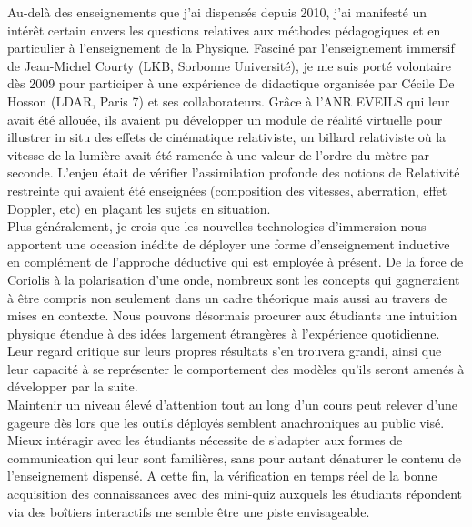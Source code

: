 \documentclass[12pt,onecolumn]{article}
\begin{document}
\indent \indent Au-delà des enseignements que j'ai dispensés depuis 2010, j'ai manifesté un intérêt certain envers les questions relatives aux méthodes pédagogiques et en particulier à l'enseignement de la Physique. Fasciné par l'enseignement immersif de Jean-Michel Courty (LKB, Sorbonne Université), je me suis porté volontaire dès 2009 pour participer à une expérience de didactique organisée par Cécile De Hosson (LDAR, Paris 7) et ses collaborateurs. Grâce à l'ANR EVEILS qui leur avait été allouée, ils avaient pu développer un module de réalité virtuelle pour illustrer in situ des effets de cinématique relativiste, un billard relativiste où la vitesse de la lumière avait été ramenée à une valeur de l'ordre du mètre par seconde. L'enjeu était de vérifier l'assimilation profonde des notions de Relativité restreinte qui avaient été enseignées (composition des vitesses, aberration, effet Doppler, etc) en plaçant les sujets en situation.\\

Plus généralement, je crois que les nouvelles technologies d'immersion nous apportent une occasion inédite de déployer une forme d'enseignement inductive en complément de l'approche déductive qui est employée à présent. De la force de Coriolis à la polarisation d'une onde, nombreux sont les concepts qui gagneraient à être compris non seulement dans un cadre théorique mais aussi au travers de mises en contexte. Nous pouvons désormais procurer aux étudiants une intuition physique étendue à des idées largement étrangères à l'expérience quotidienne. Leur regard critique sur leurs propres résultats s'en trouvera grandi, ainsi que leur capacité à se représenter le comportement des modèles qu'ils seront amenés à développer par la suite.\\

Maintenir un niveau élevé d'attention tout au long d'un cours peut relever d'une gageure dès lors que les outils déployés semblent anachroniques au public visé. Mieux intéragir avec les étudiants nécessite de s'adapter aux formes de communication qui leur sont familières, sans pour autant dénaturer le contenu de l'enseignement dispensé. A cette fin, la vérification en temps réel de la bonne acquisition des connaissances avec des mini-quiz auxquels les étudiants répondent via des boîtiers interactifs me semble être une piste envisageable.
\end{document}
